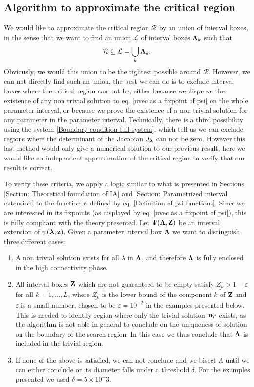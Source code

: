 \documentclass[
11pt, %
english, %
singlespacing, %
nolistspacing, %
liststotoc, %
headsepline, %
]{MastersDoctoralThesis} %
\begin{document}
\subsection{Algorithm to approximate the critical region}

We would like to approximate the critical region $\mathcal{R}$ by an union of interval boxes, in the sense that we want to find an union $\mathcal{L}$ of interval boxes $\boldsymbol{\mathrm{\Lambda}}_k$ such that
\begin{align}
	\mathcal{R} \subseteq \mathcal{L} = \bigcup_k \boldsymbol{\mathrm{\Lambda}}_k.
\end{align}	
Obviously, we would this union to be the tightest possible around $\mathcal{R}$. However, we can not directly find such an union, the best we can do is to exclude interval boxes where the critical region can not be, either because we disprove the existence of any non trivial solution to eq. \eqref{uvec as a fixpoint of psi} on the whole parameter interval, or because we prove the existence of a non trivial solution for any parameter in the parameter interval. Technically, there is a third possibility using the system \eqref{Boundary condition full system}, which tell us we can exclude regions where the determinant of the Jacobian $J_{\boldsymbol{\mathrm{\lambda}}}$ can not be zero. However this last method would only give a numerical solution to our previous result, here we would like an independent approximation of the critical region to verify that  our result is correct.

To verify these criteria, we apply a logic similar to what is presented in Sections \ref{Section: Theoretical foundation of IA} and \ref{Section: Parametrized interval extension} to the function $\psi$ defined by eq. \eqref{Definition of psi functions}. Since we are interested in its fixpoints (as displayed by eq. \eqref{uvec as a fixpoint of psi}), this is fully compliant with the theory presented. Let $\Psi(\boldsymbol{\mathrm{\Lambda}}, \boldsymbol{\mathrm{Z}})$ be an interval extension of $\psi(\boldsymbol{\mathrm{\lambda}}, \boldsymbol{\mathrm{z}})$. Given a parameter interval box $\boldsymbol{\mathrm{\Lambda}}$ we want to distinguish three different cases:
\begin{enumerate}
	\item A non trivial solution exists for all $\lambda$ in $\boldsymbol{\mathrm{\Lambda}}$, and therefore $\boldsymbol{\mathrm{\Lambda}}$ is fully enclosed in the high connectivity phase.
	\item All interval boxes $\boldsymbol{\mathrm{Z}}$ which are not guaranteed to be empty satisfy $\underline{Z_k} > 1 - \varepsilon$ for all $k = 1, \dots, L$, where $\underline{Z_k}$ is the lower bound of the component $k$ of $\boldsymbol{\mathrm{Z}}$ and $\varepsilon$ is a small number, chosen to be $\varepsilon = 10^{-2}$ in the examples presented below. This is needed to identify region where only the trivial solution $\boldsymbol{\mathrm{u}}_T$ exists, as the algorithm is not able in general to conclude on the uniqueness of solution on the boundary of the search region. In this case we thus conclude that $\boldsymbol{\mathrm{\Lambda}}$ is included in the trivial region.
	\item If none of the above is satisfied, we can not conclude and we bisect $\Lambda$ until we can either conclude or its diameter falls under a threshold $\delta$. For the examples presented we used $\delta = 5 \times 10^-3$.
\end{enumerate}
\end{document}
